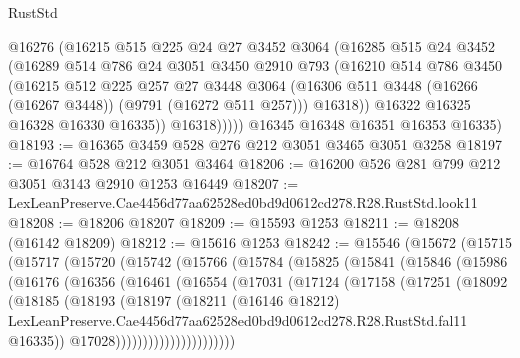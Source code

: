 \begin{lexlean}{RustStd}
\begin{coremodule}
              @16276
              (@16215
                @515
                @225
                @24
                @27
                @3452
                @3064
                (@16285
                  @515
                  @24
                  @3452
                  (@16289
                    @514
                    @786
                    @24
                    @3051
                    @3450
                    @2910
                    @793
                    (@16210
                      @514
                      @786
                      @3450
                      (@16215
                        @512
                        @225
                        @257
                        @27
                        @3448
                        @3064
                        (@16306 @511 @3448 (@16266 (@16267 @3448)) (@9791 (@16272 @511 @257)))
                        @16318))
                    @16322
                    @16325
                    @16328
                    @16330
                    @16335))
                @16318)))))
      @16345
      @16348
      @16351
      @16353
      @16335)
@18193 := @16365 @3459 @528 @276 @212 @3051 @3465 @3051 @3258
@18197 := @16764 @528 @212 @3051 @3464
@18206 := @16200 @526 @281 @799 @212 @3051 @3143 @2910 @1253 @16449
@18207 := LexLeanPreserve.Cae4456d77aa62528ed0bd9d0612cd278.R28.RustStd.look11
@18208 := @18206 @18207
@18209 := @15593 @1253
@18211 := @18208 (@16142 @18209)
@18212 := @15616 @1253
@18242 := @15546
    (@15672
      (@15715
        (@15717
          (@15720
            (@15742
              (@15766
                (@15784
                  (@15825
                    (@15841
                      (@15846
                        (@15986
                          (@16176
                            (@16356
                              (@16461
                                (@16554
                                  (@17031
                                    (@17124
                                      (@17158
                                        (@17251
                                          (@18092
                                            (@18185
                                              (@18193
                                                (@18197
                                                  (@18211
                                                    (@16146 @18212)
                                                    LexLeanPreserve.Cae4456d77aa62528ed0bd9d0612cd278.R28.RustStd.fal11
                                                    @16335))
                                                @17028))))))))))))))))))))))

\end{coremodule}
\end{lexlean}
